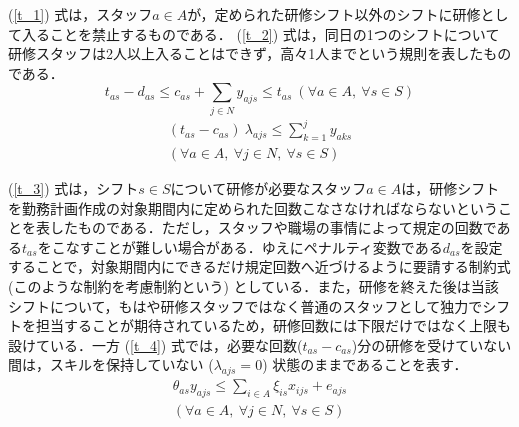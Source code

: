 \documentclass[twocolumn]{jsarticle}
\begin{document}
 (\ref{t_1}) 式は，スタッフ$a \in A$が，定められた研修シフト以外のシフトに研修として入ることを禁止するものである． (\ref{t_2}) 式は，同日の1つのシフトについて研修スタッフは2人以上入ることはできず，高々1人までという規則を表したものである．
\begin{equation}
t_{as} - d_{as} \leq c_{as} + \sum_{j \in N} y_{ajs} \leq t_{as} \ (\forall a \in A, \ \forall s \in S)
\label{t_3}
\end{equation}
\begin{eqnarray}
(t_{as} - c_{as}) \ \lambda_{ajs} \leq \sum_{k = 1}^{j} y_{aks} \nonumber \\ (\forall a \in A, \ \forall j \in N, \ \forall s \in S)
\label{t_4}
\end{eqnarray}

 (\ref{t_3}) 式は，シフト$s \in S$について研修が必要なスタッフ$a \in A$は，研修シフトを勤務計画作成の対象期間内に定められた回数こなさなければならないということを表したものである．ただし，スタッフや職場の事情によって規定の回数である$t_{as}$をこなすことが難しい場合がある．ゆえにペナルティ変数である$d_{as}$を設定することで，対象期間内にできるだけ規定回数へ近づけるように要請する制約式 (このような制約を考慮制約という) としている．また，研修を終えた後は当該シフトについて，もはや研修スタッフではなく普通のスタッフとして独力でシフトを担当することが期待されているため，研修回数には下限だけではなく上限も設けている．一方 (\ref{t_4}) 式では，必要な回数($t_{as} - c_{as}$)分の研修を受けていない間は，スキルを保持していない ($\lambda_{ajs} = 0$) 状態のままであることを表す．
\begin{eqnarray}
\theta_{as} y_{ajs} \leq \sum_{i \in A} \xi_{is} x_{ijs} + e_{ajs} \nonumber \\ (\forall a \in A, \ \forall j \in N, \ \forall s \in S)
\label{t_5}
\end{eqnarray}
\end{document}

